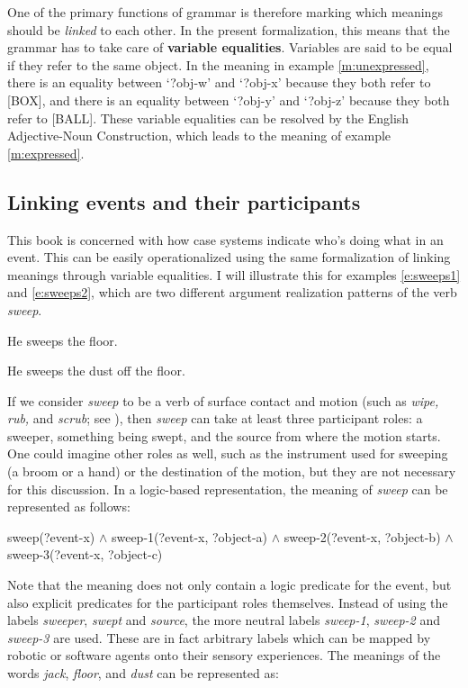 One of the primary functions of grammar is therefore marking which meanings should be {\em linked} to each other. In the present formalization, this means that the grammar has to take care of {\bfseries variable equalities}. Variables are said to be equal if they refer to the same object. In the meaning in example \ref{m:unexpressed}, there is an equality between `?obj-w' and `?obj-x' because they both refer to [BOX], and there is an equality between `?obj-y' and `?obj-z' because they both refer to [BALL]. These variable equalities can be resolved by the English Adjective-Noun Construction, which leads to the meaning of example \ref{m:expressed}.

\subsection{Linking events and their participants} 
This book is concerned with how case systems indicate who's doing what in an event. This can be easily operationalized using the same formalization of linking meanings through variable equalities. I will illustrate this for examples \ref{e:sweeps1} and \ref{e:sweeps2}, which are two different argument realization patterns of the verb {\em sweep}.

\ea
\label{e:sweeps1}
He sweeps the floor.
\item 
\label{e:sweeps2}
He sweeps the dust off the floor.
\z

If we consider {\em sweep} to be a verb of surface contact and motion (such as {\em wipe, rub,} and {\em scrub}; see \citealp{levin99two}), then {\em sweep} can take at least three participant roles: a sweeper, something being swept, and the source from where the motion starts. One could imagine other roles as well, such as the instrument used for sweeping (a broom or a hand) or the destination of the motion, but they are not necessary for this discussion. In a logic-based representation, the meaning of {\em sweep} can be represented as follows:

\ea
sweep(?event-x) $\wedge$ sweep-1(?event-x, ?object-a) $\wedge$ sweep-2(?event-x, ?object-b) $\wedge$ sweep-3(?event-x, ?object-c)
\z

Note that the meaning does not only contain a logic predicate for the event, but also explicit predicates for the participant roles themselves. Instead of using the labels {\em sweeper}, {\em swept} and {\em source}, the more neutral labels {\em sweep-1}, {\em sweep-2} and {\em sweep-3} are used. These are in fact arbitrary labels which can be mapped by robotic or software agents onto their sensory experiences. The meanings of the words {\em jack}, {\em floor}, and {\em dust} can be represented as:

